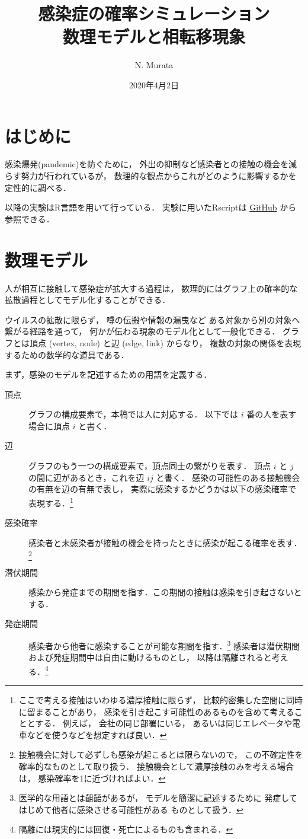 \documentclass[10pt,oneside]{scrartcl}
\author{N. Murata}
\date{2020年4月2日}
\title{感染症の確率シミュレーション\\\medskip
\large 数理モデルと相転移現象}
\begin{document}
\maketitle

\section{はじめに}
\label{sec:org7aadbd6}

感染爆発(pandemic)を防ぐために，
外出の抑制など感染者との接触の機会を減らす努力が行われているが，
数理的な観点からこれがどのように影響するかを定性的に調べる．

以降の実験はR言語を用いて行っている．
実験に用いたRscriptは
\href{https://github.com/noboru-murata/epidemic-model}{GitHub}
から参照できる．

\section{数理モデル}
\label{sec:org95c6141}
人が相互に接触して感染症が拡大する過程は，
数理的にはグラフ上の確率的な拡散過程としてモデル化することができる．

ウイルスの拡散に限らず，
噂の伝搬や情報の漏曳など
ある対象から別の対象へ繋がる経路を通って，
何かが伝わる現象のモデル化として一般化できる．
グラフとは頂点 (vertex, node) と辺 (edge, link) からなり，
複数の対象の関係を表現するための数学的な道具である．

まず，感染のモデルを記述するための用語を定義する．
\begin{description}
\item[{頂点}] グラフの構成要素で，本稿では人に対応する．
以下では \(i\) 番の人を表す場合に頂点 \(i\) と書く．
\item[{辺}] グラフのもう一つの構成要素で，頂点同士の繋がりを表す．
頂点 \(i\) と \(j\) の間に辺があるとき，これを辺 \(ij\) と書く．
感染の可能性のある接触機会の有無を辺の有無で表し，
実際に感染するかどうかは以下の感染確率で表現する．\footnote{ここで考える接触はいわゆる濃厚接触に限らず，
比較的密集した空間に同時に留まることがあり，
感染を引き起こす可能性のあるものを含めて考えることとする．
例えば，
会社の同じ部署にいる，
あるいは同じエレベータや電車などを使うなどを想定すれば良い．}
\item[{感染確率}] 感染者と未感染者が接触の機会を持ったときに感染が起こる確率を表す．\footnote{接触機会に対して必ずしも感染が起こるとは限らないので，
この不確定性を確率的なものとして取り扱う．
接触機会として濃厚接触のみを考える場合は，
感染確率を1に近づければよい．}
\item[{潜伏期間}] 感染から発症までの期間を指す．この期間の接触は感染を引き起さないとする．
\item[{発症期間}] 感染者から他者に感染することが可能な期間を指す．\footnote{医学的な用語とは齟齬があるが，
モデルを簡潔に記述するために
発症してはじめて他者に感染させる可能性がある
ものとして扱う．}
感染者は潜伏期間および発症期間中は自由に動けるものとし，
以降は隔離されると考える．\footnote{隔離には現実的には回復・死亡によるものも含まれる．}
\end{description}
\end{document}
